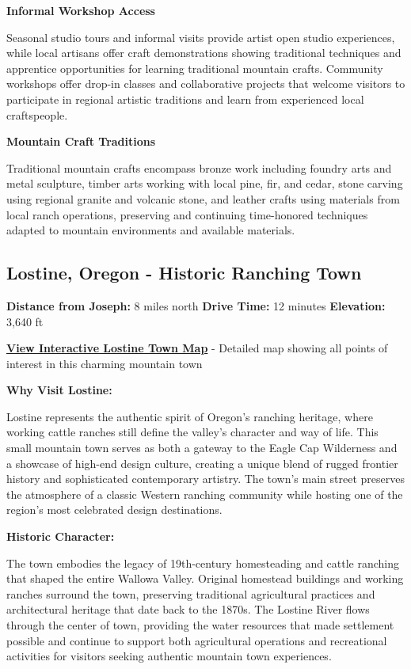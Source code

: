 \documentclass[
  11pt,
  letterpaper,
  DIV=10,
  numbers=noendperiod]{scrartcl}
\begin{document}
\textbf{Informal Workshop Access}

Seasonal studio tours and informal visits provide artist open studio
experiences, while local artisans offer craft demonstrations showing
traditional techniques and apprentice opportunities for learning
traditional mountain crafts. Community workshops offer drop-in classes
and collaborative projects that welcome visitors to participate in
regional artistic traditions and learn from experienced local
craftspeople.

\textbf{Mountain Craft Traditions}

Traditional mountain crafts encompass bronze work including foundry arts
and metal sculpture, timber arts working with local pine, fir, and
cedar, stone carving using regional granite and volcanic stone, and
leather crafts using materials from local ranch operations, preserving
and continuing time-honored techniques adapted to mountain environments
and available materials.

\subsection{Lostine, Oregon - Historic Ranching
Town}\label{lostine-oregon---historic-ranching-town}

\textbf{Distance from Joseph:} 8 miles north \textbar{} \textbf{Drive
Time:} 12 minutes \textbar{} \textbf{Elevation:} 3,640 ft

\textbf{\href{images/lostine_oregon_town_map.html}{View Interactive
Lostine Town Map}} - Detailed map showing all points of interest in this
charming mountain town

\textbf{Why Visit Lostine:}

Lostine represents the authentic spirit of Oregon's ranching heritage,
where working cattle ranches still define the valley's character and way
of life. This small mountain town serves as both a gateway to the Eagle
Cap Wilderness and a showcase of high-end design culture, creating a
unique blend of rugged frontier history and sophisticated contemporary
artistry. The town's main street preserves the atmosphere of a classic
Western ranching community while hosting one of the region's most
celebrated design destinations.

\textbf{Historic Character:}

The town embodies the legacy of 19th-century homesteading and cattle
ranching that shaped the entire Wallowa Valley. Original homestead
buildings and working ranches surround the town, preserving traditional
agricultural practices and architectural heritage that date back to the
1870s. The Lostine River flows through the center of town, providing the
water resources that made settlement possible and continue to support
both agricultural operations and recreational activities for visitors
seeking authentic mountain town experiences.
\end{document}

